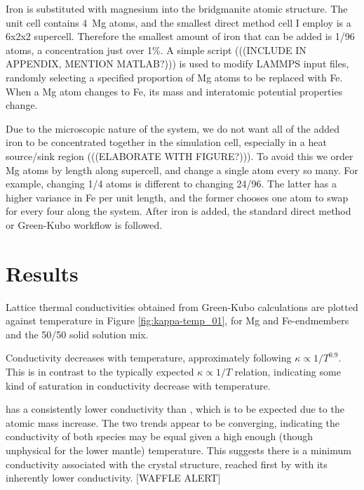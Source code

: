 Iron is substituted with magnesium into the bridgmanite atomic structure. The unit cell contains 4~Mg atoms, and the smallest direct method cell I employ is a 6x2x2 supercell. Therefore the smallest amount of iron that can be added is 1/96 atoms, a concentration just over 1\%. A simple script (((INCLUDE IN APPENDIX, MENTION MATLAB?))) is used to modify LAMMPS input files, randomly selecting a specified proportion of Mg atoms to be replaced with Fe. When a Mg atom changes to Fe, its mass and interatomic potential properties change. 

Due to the microscopic nature of the system, we do not want all of the added iron to be concentrated together in the simulation cell, especially in a heat source/sink region (((ELABORATE WITH FIGURE?))). To avoid this we order Mg atoms by length along supercell, and change a single atom every so many. For example, changing 1/4 atoms is different to changing 24/96. The latter has a higher variance in Fe per unit length, and the former chooses one atom to swap for every four along the system. After iron is added, the standard direct method or Green-Kubo workflow is followed.



\section{Results}

Lattice thermal conductivities obtained from Green-Kubo calculations are plotted against temperature in Figure \ref{fig:kappa-temp_01}, for Mg and Fe-endmembers and the 50/50 solid solution mix.

Conductivity decreases with temperature, approximately following $\kappa \propto 1/T^{0.9}$. This is in contrast to the typically expected $\kappa \propto 1/T$ relation, indicating some kind of saturation in conductivity decrease with temperature.

\fesios has a consistently lower conductivity than \mgsio, which is to be expected due to the atomic mass increase. The two trends appear to be converging, indicating the conductivity of both species may be equal given a high enough (though unphysical for the lower mantle) temperature. This suggests there is a minimum conductivity associated with the crystal structure, reached first by \fesios with its inherently lower conductivity. [WAFFLE ALERT]

